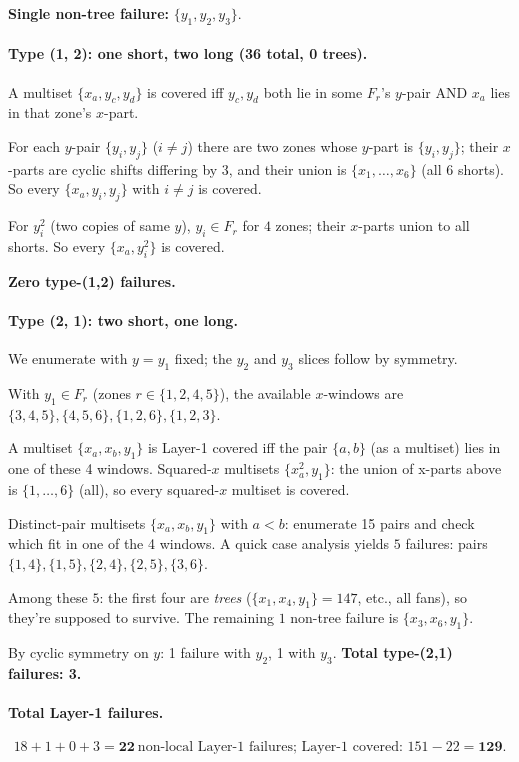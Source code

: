 \documentclass[11pt]{article}
\theoremstyle{definition}
\begin{document}
\textbf{Single non-tree failure:} $\{y_1, y_2, y_3\}$.

\paragraph{Type (1, 2): one short, two long (36 total, 0 trees).} A multiset
$\{x_a, y_c, y_d\}$ is covered iff $y_c, y_d$ both lie in some $F_r$'s $y$-pair
AND $x_a$ lies in that zone's $x$-part.

For each $y$-pair $\{y_i, y_j\}$ ($i\ne j$) there are two zones whose $y$-part
is $\{y_i, y_j\}$; their $x$-parts are cyclic shifts differing by $3$, and
their union is $\{x_1,\ldots, x_6\}$ (all $6$ shorts). So every
$\{x_a, y_i, y_j\}$ with $i\ne j$ is covered.

For $y_i^2$ (two copies of same $y$), $y_i\in F_r$ for $4$ zones; their
$x$-parts union to all shorts. So every $\{x_a, y_i^2\}$ is covered.

\textbf{Zero type-(1,2) failures.}

\paragraph{Type (2, 1): two short, one long.} We enumerate with $y=y_1$
fixed; the $y_2$ and $y_3$ slices follow by symmetry.

With $y_1 \in F_r$ (zones $r\in\{1,2,4,5\}$), the available $x$-windows are
$\{3,4,5\}, \{4,5,6\}, \{1,2,6\}, \{1,2,3\}$.

A multiset $\{x_a, x_b, y_1\}$ is Layer-1 covered iff the pair $\{a,b\}$
(as a multiset) lies in one of these 4 windows. Squared-$x$ multisets
$\{x_a^2, y_1\}$: the union of x-parts above is $\{1,\ldots,6\}$ (all),
so every squared-$x$ multiset is covered.

Distinct-pair multisets $\{x_a, x_b, y_1\}$ with $a<b$: enumerate 15 pairs
and check which fit in one of the 4 windows. A quick case analysis yields
$5$ failures: pairs $\{1,4\}, \{1,5\}, \{2,4\}, \{2,5\}, \{3,6\}$.

Among these $5$: the first four are \emph{trees}
($\{x_1, x_4, y_1\} = 147$, etc., all fans), so they're supposed to survive.
The remaining $1$ non-tree failure is $\{x_3, x_6, y_1\}$.

By cyclic symmetry on $y$: 1 failure with $y_2$, 1 with $y_3$. \textbf{Total
type-(2,1) failures: 3.}

\paragraph{Total Layer-1 failures.}
\[
18 + 1 + 0 + 3 = \mathbf{22}\ \text{non-local Layer-1 failures; Layer-1 covered: } 151-22=\mathbf{129}.
\]
\end{document}
